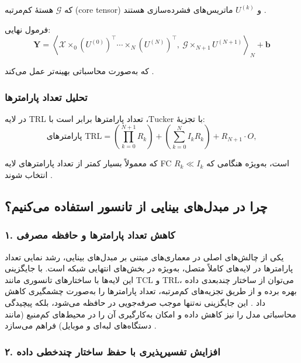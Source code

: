 که \(\mathcal{G}\) هستهٔ کم‌مرتبه (core tensor) و \(U^{(k)}\) ماتریس‌های فشرده‌سازی هستند \cite{kossaifi2020tensorregression}.

فرمول نهایی:
\begin{equation}
	\mathbf{Y} = \left\langle 
	\mathcal{X} \times_0 (U^{(0)})^\top \cdots \times_N (U^{(N)})^\top,\ 
	\mathcal{G} \times_{N+1} U^{(N+1)} 
	\right\rangle_N + \mathbf{b}
\end{equation}

که به‌صورت محاسباتی بهینه‌تر عمل می‌کند \cite{kossaifi2020tensorregression}.

\subsubsection*{تحلیل تعداد پارامترها}

در لایه TRL با تجزیۀ \(\text{Tucker}\)، تعداد پارامترها برابر است با:
\begin{equation}
	\text{پارامترهای TRL} = \left(\prod_{k=0}^{N+1} R_k\right) 
	+ \left(\sum_{k=0}^{N} I_k R_k\right) 
	+ R_{N+1} \cdot O,
\end{equation}

که معمولاً بسیار کمتر از تعداد پارامترهای لایه FC است، به‌ویژه هنگامی که \(R_k \ll I_k\) انتخاب شوند \cite{kossaifi2020tensorregression}.


\subsection{چرا در مبدل‌های بینایی از تانسور استفاده می‌کنیم؟}

\subsubsection{۱. \textbf{کاهش تعداد پارامترها و حافظه مصرفی}}

یکی از چالش‌های اصلی در معماری‌های مبتنی بر مبدل‌های بینایی، رشد نمایی تعداد پارامترها در لایه‌های کاملاً متصل، به‌ویژه در بخش‌های انتهایی شبکه است. با جایگزینی این لایه‌ها با ساختارهای تانسوری مانند TCL و TRL، می‌توان از ساختار چندبعدی داده بهره برده و از طریق تجزیه‌های کم‌مرتبه، تعداد پارامترها را به‌صورت چشمگیری کاهش داد \cite{novikov2015tensorizing, kossaifi2017tensorcontraction, kossaifi2020tensorregression}. این جایگزینی نه‌تنها موجب صرفه‌جویی در حافظه می‌شود، بلکه پیچیدگی محاسباتی مدل را نیز کاهش داده و امکان به‌کارگیری آن را در محیط‌های کم‌منبع (مانند دستگاه‌های لبه‌ای و موبایل) فراهم می‌سازد \cite{hamreras2025tensorization}.

\subsubsection{۲. \textbf{افزایش تفسیرپذیری با حفظ ساختار چندخطی داده}}

